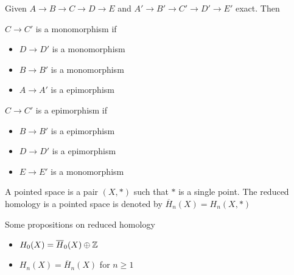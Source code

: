 \documentclass{report}
\begin{document}
\begin{lemma}
    Given $A \to B \to C \to D \to E$ and $A' \to B' \to C' \to D' \to E'$ exact. Then
    \begin{center}
    \end{center}

    $C \to C'$ is a monomorphism if 
    \begin{itemize}
        \item $D \to D'$ is a monomorphism
        \item $B \to B'$ is a monomorphism
        \item $A \to A'$ is a epimorphism
    \end{itemize}

    $C \to C'$ is a epimorphism if 
    \begin{itemize}
        \item $B \to B'$ is a epimorphism
        \item $D \to D'$ is a epimorphism
        \item $E \to E'$ is a monomorphism
    \end{itemize}
\end{lemma}

\begin{longproof}
\end{longproof}

\begin{definition}
    A pointed space is a pair $(X, *)$ such that $*$ is a single point. The reduced homology is a pointed space is denoted by $\overline{H}_n(X) = H_n(X, *)$
\end{definition}

\begin{proposition}
    Some propositions on reduced homology
    \begin{itemize}
        \item $H_0(X) = \overline{H}_0(X) \oplus \mathbb{Z}$
        \item $H_n(X) = \overline{H}_n(X)$ for $n \geq 1$
    \end{itemize}
\end{proposition}
\end{document}
